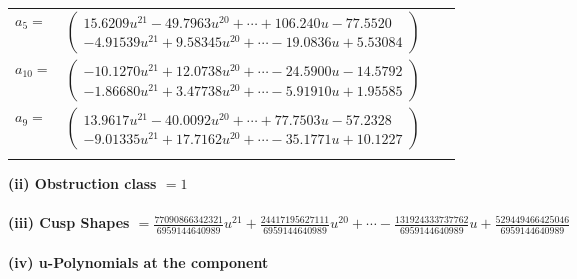 \documentclass[1p]{elsarticle_modified}
\theoremstyle{definition}
\begin{document}
\begin{tabular}{m{7pt} m{180pt} m{7pt} m{180pt} }
\flushright $a_{5}=$&$\begin{pmatrix}15.6209 u^{21}-49.7963 u^{20}+\cdots+106.240 u-77.5520\\-4.91539 u^{21}+9.58345 u^{20}+\cdots-19.0836 u+5.53084\end{pmatrix}$ \\
\flushright $a_{10}=$&$\begin{pmatrix}-10.1270 u^{21}+12.0738 u^{20}+\cdots-24.5900 u-14.5792\\-1.86680 u^{21}+3.47738 u^{20}+\cdots-5.91910 u+1.95585\end{pmatrix}$ \\
\flushright $a_{9}=$&$\begin{pmatrix}13.9617 u^{21}-40.0092 u^{20}+\cdots+77.7503 u-57.2328\\-9.01335 u^{21}+17.7162 u^{20}+\cdots-35.1771 u+10.1227\end{pmatrix}$\\&\end{tabular}
\flushleft \textbf{(ii) Obstruction class $= 1$}\\~\\
\flushleft \textbf{(iii) Cusp Shapes $= \frac{77090866342321}{6959144640989} u^{21}+\frac{24417195627111}{6959144640989} u^{20}+\cdots-\frac{131924333737762}{6959144640989} u+\frac{529449466425046}{6959144640989}$}\\~\\
\newpage\renewcommand{\arraystretch}{1}
\flushleft \textbf{(iv) u-Polynomials at the component}\newline \\
\end{document}
